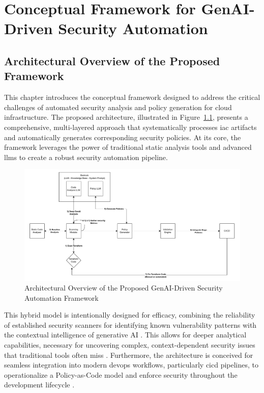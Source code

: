 \chapter{Conceptual Framework for GenAI-Driven Security Automation}

\section{Architectural Overview of the Proposed Framework}

This chapter introduces the conceptual framework designed to address the critical challenges of automated security analysis and policy generation for cloud infrastructure. The proposed architecture, illustrated in Figure~\ref{fig:prototype-architecture}, presents a comprehensive, multi-layered approach that systematically processes \gls{iac} artifacts and automatically generates corresponding security policies. At its core, the framework leverages the power of traditional static analysis tools and advanced \glspl{llm} to create a robust security automation pipeline.

\begin{figure}[htbp]
\centering
\includegraphics[width=\textwidth]{Figures/prototype.pdf}
\caption{Architectural Overview of the Proposed GenAI-Driven Security Automation Framework}
\label{fig:prototype-architecture}
\end{figure}

This hybrid model is intentionally designed for efficacy, combining the reliability of established security scanners for identifying known vulnerability patterns with the contextual intelligence of generative AI \cite{khanna_enhancing_2024}. This allows for deeper analytical capabilities, necessary for uncovering complex, context-dependent security issues that traditional tools often miss \cite{akiri_generative_2025}. Furthermore, the architecture is conceived for seamless integration into modern \gls{devops} workflows, particularly \gls{cicd} pipelines, to operationalize a Policy-as-Code model and enforce security throughout the development lifecycle \cite{khanna_enhancing_2024}.

